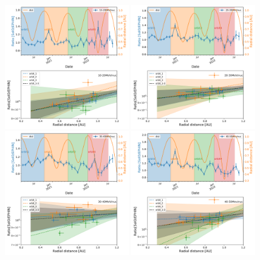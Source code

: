 \begin{figure}[!htb]
    \centering
    \includegraphics[width =0.48\textwidth, height = 0.48\textwidth]{images/ACR/seperate_mask_1-3_newSOHOSEPmask/ratio_time_radialgradient_10-20MeV_2.png}
    \includegraphics[width =0.48\textwidth, height = 0.48\textwidth]{images/ACR/seperate_mask_1-3_newSOHOSEPmask/ratio_time_radialgradient_20-30MeV_2.png}
    \includegraphics[width =0.48\textwidth, height = 0.48\textwidth]{images/ACR/seperate_mask_1-3_newSOHOSEPmask/ratio_time_radialgradient_30-40MeV_2.png}
    \includegraphics[width =0.48\textwidth, height = 0.48\textwidth]{images/ACR/seperate_mask_1-3_newSOHOSEPmask/ratio_time_radialgradient_40-50MeV_2.png}

\end{figure}
